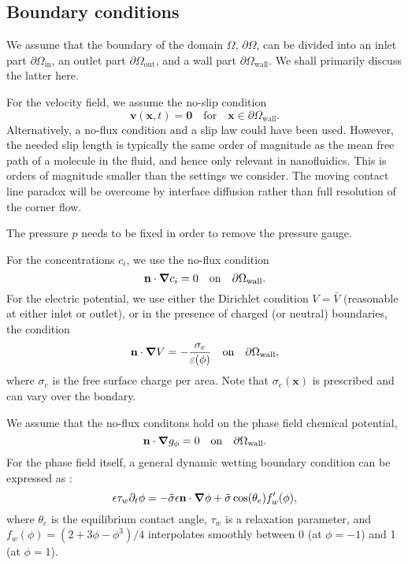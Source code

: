 \documentclass[preprint,pre,superscriptaddress,a4paper]{revtex4-1}
\renewcommand{\v}[1]{\ensuremath{\mathbf{#1}}} %
\newcommand{\gv}[1]{\ensuremath{\mbox{\boldmath$ #1 $}}}
\newcommand{\grad}[1]{\gv{\nabla} #1} %
\newcommand{\pdt}[1]{\partial_t #1}
\newcommand{\wall}{\mathrm{wall}}
\newcommand{\inlet}{\mathrm{in}}
\newcommand{\outlet}{\mathrm{out}}
\begin{document}
\subsection{Boundary conditions}
We assume that the boundary of the domain $\Omega$, $\partial\Omega$, can be divided into an inlet part $\partial\Omega_\inlet$, an outlet part $\partial\Omega_\outlet$, and a wall part $\partial\Omega_\wall$.
We shall primarily discuss the latter here.

For the velocity field, we assume the no-slip condition
\begin{equation}
  \v v (\v x, t) = \v 0 \quad \textrm{for} \quad \v x \in \partial\Omega_\wall.
\end{equation}
Alternatively, a no-flux condition and a slip law could have been used.
However, the needed slip length is typically the same order of magnitude as the mean free path of a molecule in the fluid, and hence only relevant in nanofluidics.
This is orders of magnitude smaller than the settings we consider.
The moving contact line paradox will be overcome by interface diffusion rather than full resolution of the corner flow.

The pressure $p$ needs to be fixed in order to remove the pressure gauge.

For the concentrations $c_i$, we use the no-flux condition
\begin{equation}
  \v n \cdot \grad c_i = 0 \quad \textrm{on} \quad \partial\Omega_\wall.
\end{equation}
For the electric potential, we use either the Dirichlet condition $V=\bar V$ (reasonable at either inlet or outlet), or in the presence of charged (or neutral) boundaries, the condition
\begin{equation}
  \v n \cdot \grad V = -\frac{\sigma_e}{\varepsilon(\phi)} \quad \textrm{on} \quad \partial\Omega_\wall,
\end{equation}
where $\sigma_e$ is the free surface charge per area. Note that $\sigma_e(\v x)$ is prescribed and can vary over the bondary.

We assume that the no-flux conditons hold on the phase field chemical potential,
\begin{equation}
  \v n \cdot \grad g_\phi = 0 \quad \textrm{on} \quad \partial\Omega_\wall.
\end{equation}
For the phase field itself, a general dynamic wetting boundary condition can be expressed as \cite{carlson2012}:
\begin{equation}
  \epsilon \tau_w \pdt \phi = - \tilde\sigma \epsilon \v n \cdot \grad \phi + \tilde\sigma \cos(\theta_e) f_w' (\phi),
  \label{eq:BC_phi_dynamic}
\end{equation}
where $\theta_e$ is the equilibrium contact angle, $\tau_w$ is a relaxation parameter, and $f_w(\phi) = (2+3\phi-\phi^3)/4$ interpolates smoothly between 0 (at $\phi=-1$) and 1 (at $\phi=1$).
\end{document}
